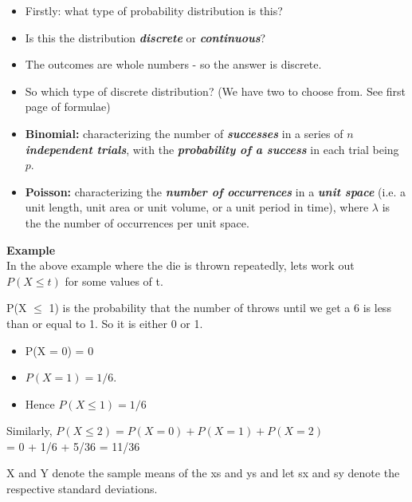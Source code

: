 {
\begin{itemize}
\item Firstly: what type of probability distribution is this?

\item Is this the distribution \textbf{\emph{discrete}} or  \textbf{\emph{continuous}}?

\item The outcomes are whole numbers - so the answer is discrete.

\item So which type of discrete distribution? (We have two to choose from. See first page of formulae)


\item \textbf{Binomial:} characterizing the number of \textbf{\emph{successes}} in a series of \textbf{\emph{$n$ independent trials}}, with the \textbf{\emph{probability of a success}} in each trial being $p$.

\item \textbf{Poisson:}  characterizing the \textbf{\emph{number of occurrences}} in a \textbf{\emph{unit space}} (i.e. a unit length, unit area or unit volume, or a unit period in time), where $\lambda$ is the the number of occurrences per unit space.

\end{itemize}
}



\textbf{Example}\\

In the above example where the die is thrown repeatedly, lets work out $P(X \leq t)$ for some values of t.

P(X $\leq$ 1) is the probability that the number of throws until we get a 6 is less than or equal to 1. So it is either 0 or 1. 

\begin{itemize}
\item P(X = 0) = 0 
\item $P(X = 1) = 1/6$.
\item  Hence $P(X \leq 1) = 1/6$
\end{itemize}

Similarly, $P(X \leq 2) = P(X = 0) + P(X = 1) + P(X = 2)$\\ = 0 + 1/6 + 5/36 = 11/36



X and Y denote the sample means of the xs and ys and let sx and sy
denote the respective standard deviations.

